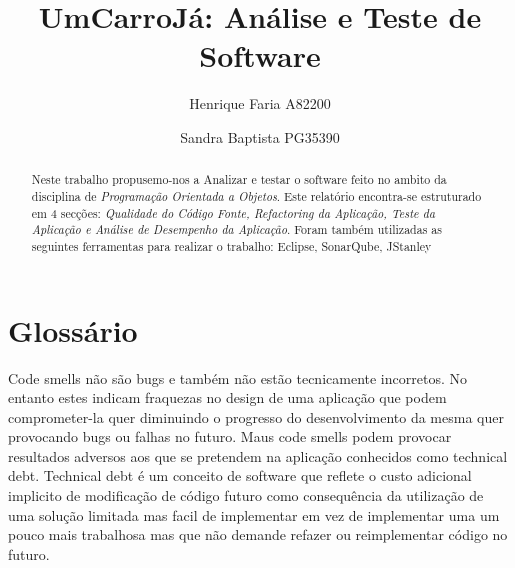 

\title{UmCarroJá: Análise e Teste de Software}

\author{Henrique Faria A82200 \and Sandra Baptista PG35390}




\maketitle

\begin{abstract}
Neste trabalho propusemo-nos a Analizar e testar o software feito no ambito da disciplina de \textit{Programação Orientada a Objetos}.\newline
Este relatório encontra-se estruturado em 4 secções: \textit{Qualidade do Código Fonte, Refactoring da Aplicação, Teste da Aplicação e Análise de Desempenho da Aplicação}.\newline
Foram também utilizadas as seguintes ferramentas para realizar o trabalho:\newline
Eclipse, SonarQube, JStanley
\end{abstract}

\section{Glossário}

Code smells não são bugs e também não estão tecnicamente incorretos. No entanto estes indicam fraquezas no design de uma aplicação que podem comprometer-la quer diminuindo o progresso do desenvolvimento da mesma quer provocando bugs ou falhas no futuro. Maus code smells podem provocar resultados adversos aos que se pretendem na aplicação conhecidos como technical debt.\newline
Technical debt é um conceito de software que reflete o custo adicional implicito de modificação de código futuro como consequência da utilização de uma solução limitada mas facil de implementar em vez de implementar uma um pouco mais trabalhosa mas que não demande refazer ou reimplementar código no futuro.


